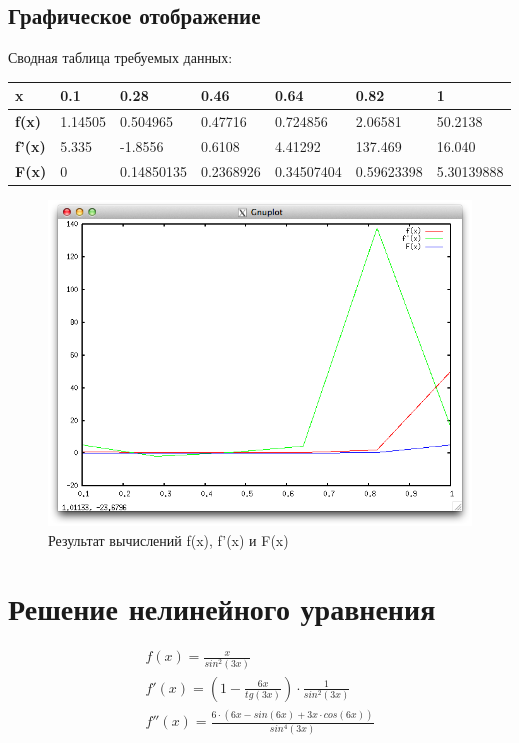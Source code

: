 \documentclass{article}
\begin{document}
\subsection{Графическое отображение}
Сводная таблица требуемых данных:
\begin{table}[h!]
  \begin{tabular}{|l|l|l|l|l|l|l|}
  \hline
  \bfseries x & 0.1 & 0.28 & 0.46 & 0.64 & 0.82 & 1\\
  \hline
  \bfseries f(x) & 1.14505 & 0.504965 & 0.47716 & 0.724856 & 2.06581 & 50.2138\\
  \hline
  \bfseries f'(x) & 5.335 & -1.8556 & 0.6108 & 4.41292 & 137.469 & 16.040\\
  \hline
  \bfseries F(x) & 0 & 0.14850135 & 0.2368926 & 0.34507404 & 0.59623398 &5.30139888\\
  \hline
  \end{tabular}
\end{table}

\begin{figure}[h!]
  \includegraphics[width=13cm]{result_of_integ_diff.png}
  \caption{Результат вычислений f(x), f'(x) и F(x)}
  \label{interpolations_img}
\end{figure}

\section{Решение нелинейного уравнения}

\begin{displaymath}
  \begin{array}{ccc}
    f(x) = \frac{x}{sin^2(3x)}  \\
    f'(x) = (1 - \frac{6x}{tg(3x)}) \cdot \frac{1}{sin^2(3x)}\\
    f''(x) = \frac{6 \cdot (6x - sin(6x) + 3x \cdot cos(6x))}{sin^4(3x) }\\
  \end{array}
\end{displaymath}
\end{document}
